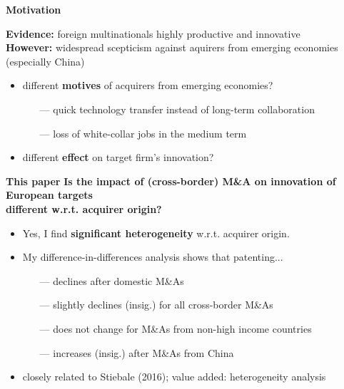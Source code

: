 \documentclass{beamer} %
\begin{document}
\begin{frame}{\textbf{Motivation}}
	\begin{finding*}{}{}
		\textbf{Evidence:} foreign multinationals highly productive and innovative \\
		\textbf{However:} widespread scepticism against aquirers from emerging economies (especially China)
	\end{finding*}
	\pause
	\begin{itemize}
		\vspace{.2cm}
		\item different \textbf{motives} of acquirers from emerging economies?
		\begin{itemize}
			\item[---] quick technology transfer instead of long-term collaboration
			\item[---] loss of white-collar jobs in the medium term
		\end{itemize}
		\item different \textbf{effect} on target firm's innovation?
	\end{itemize}
\end{frame}

\begin{frame}{\textbf{This paper}}
	\textbf{Is the impact of (cross-border) M\&A on innovation of European targets} \\
	\textbf{different w.r.t. acquirer origin?}
	\vspace{20pt}
	\pause
	\begin{itemize}
		\item Yes, I find \textbf{significant heterogeneity} w.r.t. acquirer origin.
		\vspace{.3cm}
		\item My difference-in-differences analysis shows that patenting...
		\begin{itemize}
		    \item[---]declines after domestic M\&As
		    \item[---]slightly declines (insig.) for all cross-border M\&As
		    \item[---]does not change for M\&As from non-high income countries
		    \item[---]increases (insig.) after M\&As from China
		\end{itemize}
		\vspace{.5cm}
		\item closely related to Stiebale (2016); value added: heterogeneity analysis
	\end{itemize}
\end{frame}
\end{document}
